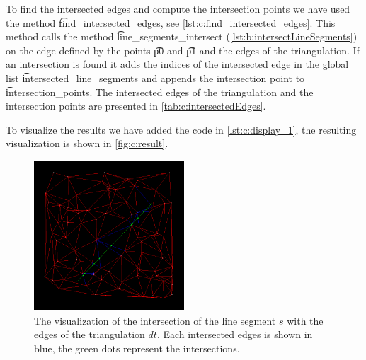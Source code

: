 To find the intersected edges and compute the intersection points we have used the method \t{find_intersected_edges}, see \autoref{lst:c:find_intersected_edges}. This method calls the method \t{line_segments_intersect} (\autoref{lst:b:intersectLineSegments}) on the edge defined by the points \t{p0} and \t{p1} and the edges of the triangulation. If an intersection is found it adds the indices of the intersected edge in the global list \t{intersected_line_segments} and appends the intersection point to \t{intersection_points}. The intersected edges of the triangulation and the intersection points are presented in \autoref{tab:c:intersectedEdges}.



To visualize the results we have added the code in \autoref{lst:c:display_1}, the resulting visualization is shown in \autoref{fig:c:result}.



\begin{figure}
	\centering
	\includegraphics[width=0.5\textwidth]{./img/c_result}		
	\caption{The visualization of the intersection of the line segment $s$ with the edges of the triangulation $dt$. Each intersected edges is shown in blue, the green dots represent the intersections.}
	\label{fig:c:result}
\end{figure}


